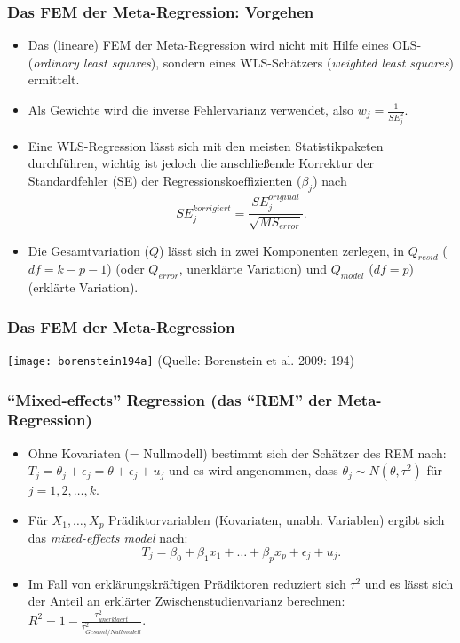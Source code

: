 \begin{frame}[plain]
  \frametitle{Das FEM der Meta-Regression: Vorgehen}
  \begin{itemize}
  \item Das (lineare) FEM der Meta-Regression wird nicht mit Hilfe eines OLS-
    (\emph{ordinary least squares}), sondern eines WLS-Schätzers (\emph{weighted
      least squares}) ermittelt.
  \item Als Gewichte wird die inverse Fehlervarianz verwendet, also $w_j =
    \frac{1}{SE_j^2}$.
  \item Eine WLS-Regression lässt sich mit den meisten Statistikpaketen
    durchführen, wichtig ist jedoch die anschließende Korrektur der
    Standardfehler (SE) der Regressionskoeffizienten ($\beta_j$) nach
    \begin{equation}
      SE^{korrigiert}_j = \frac{SE^{original}_j}{\sqrt{MS_{error}}}.
    \end{equation}
  \item Die Gesamtvariation ($Q$) lässt sich in zwei Komponenten zerlegen, in
    $Q_{resid}$ ($df=k-p-1$) (oder $Q_{error}$, unerklärte Variation) und
    $Q_{model}$ ($df=p$) (erklärte Variation).
  \end{itemize}
\end{frame}


\begin{frame}[shrink = 5]
  \frametitle{Das FEM der Meta-Regression}
  \texttt{[image: borenstein194a]}
\newline(Quelle: Borenstein et al. 2009: 194)
\end{frame}



\begin{frame}[plain]
  \frametitle{"`Mixed-effects"' Regression (das "`REM"' der Meta-Regression)}
  \begin{itemize}
  \item Ohne Kovariaten (= Nullmodell) bestimmt sich der Schätzer des REM nach:
    $T_j = \theta_j + \epsilon_j = \theta + \epsilon_j + u_j$ und es wird angenommen, dass
    $\theta_j \sim N(\theta, \tau^2)$ für $j = 1,2,\ldots,k$.
  \item Für $X_1, \ldots, X_p$ Prädiktorvariablen (Kovariaten, unabh. Variablen)
    ergibt sich das \emph{mixed-effects model} nach:
    \begin{equation}
      T_j = \beta_0 + \beta_1 x_1 + \ldots + \beta_px_p + \epsilon_j + u_j.
    \end{equation}
  \item Im Fall von erklärungskräftigen Prädiktoren reduziert sich $\tau^2$ und
    es lässt sich der Anteil an erklärter Zwischenstudienvarianz berechnen: $R^2
    = 1- \frac{\tau^2_{unerklaert}}{\tau^2_{Gesamt/Nullmodell}}$.
  \end{itemize}

  \citep[Quelle: ][98]{sutton_methods_2000}
\end{frame}


